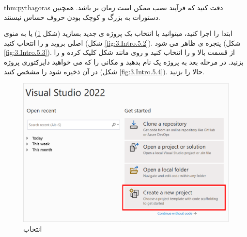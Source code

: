 \textbf{\vspace{-10pt}}

\begin{theo}{thm:pythagoras}
{
    \Large
    دقت کنید که فرآیند نصب ممکن است زمان بر باشد. همچنین دستورات  به بزرگ و کوچک بودن حروف حساس نیستند.
}
\end{theo}

\textbf{\vspace{-30pt}}
\title{
    \LARGE
}
\textbf{\vspace{-10pt}}

{
    \Large
    \begin{spacing}{1.5}
        ابتدا  را اجرا کنید، میتوانید با انتخاب  یک پروژه ی جدید بسازید (شکل \ref{fig:3.Intro.5.1}) یا به منوی اصلی بروید و  را انتخاب کنید (شکل \ref{fig:3.Intro.5.2}).
        پنجره ی  ظاهر می شود (شکل \ref{fig:3.Intro.5.3}).
        از قسمت بالا  و  را انتخاب کنید و روی  مانند شکل کلیک کرده و  را بزنید.
        در مرحله بعد به پروژه یک نام بدهید و مکانی را که می خواهید دایرکتوری پروژه در آن ذخیره شود را مشخص کنید (شکل \ref{fig:3.Intro.5.4}).
        حالا  را بزنید.

        \begin{figure}[H]
            \centering
            \setlength{\belowcaptionskip}{-10pt}
            \includegraphics[width=\textwidth]{Images/3/3.Intro.5.1}
            \caption{انتخاب }
            \label{fig:3.Intro.5.1}
        \end{figure}


\end{spacing}}
